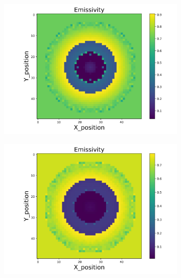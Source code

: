 \begin{figure}[p]
\begin{minipage}{\textwidth}
        \begin{subfigure}{0.325\textwidth}
            \centering
            \includegraphics[width=\textwidth]{figures/raw_data/23/linear/emi_cal.jpg}
        \end{subfigure}
        \begin{subfigure}{0.325\textwidth}
            \centering
            \includegraphics[width=\textwidth]{figures/raw_data/24/linear/emi_cal.jpg}
        \end{subfigure}
    \end{minipage}\\
    \begin{minipage}{\textwidth}

\end{minipage}
\end{figure}
